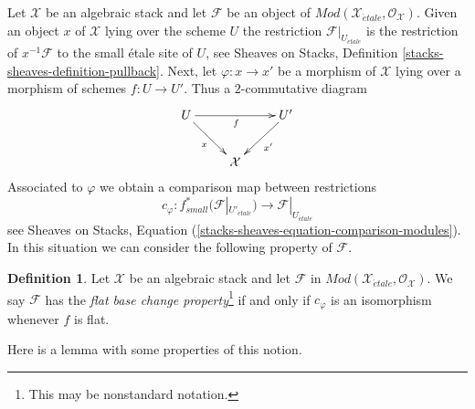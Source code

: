 \documentclass{stacks-project}
\theoremstyle{plain}
\theoremstyle{definition}
\newtheorem{definition}[subsection]{Definition}
\theoremstyle{remark}
\numberwithin{equation}{subsection}
\def\etale{{\acute{e}tale}}
\begin{document}
\noindent
Let $\mathcal{X}$ be an algebraic stack and let $\mathcal{F}$ be an object
of $\textit{Mod}(\mathcal{X}_\etale, \mathcal{O}_\mathcal{X})$.
Given an object $x$ of $\mathcal{X}$ lying over the scheme $U$ the
restriction $\mathcal{F}|_{U_\etale}$ is the restriction of
$x^{-1}\mathcal{F}$ to the small \'etale site of $U$, see
Sheaves on Stacks, Definition \ref{stacks-sheaves-definition-pullback}.
Next, let $\varphi : x \to x'$ be a morphism of $\mathcal{X}$ lying
over a morphism of schemes $f : U \to U'$. Thus a $2$-commutative diagram
$$
\xymatrix{
U \ar[rd]_x \ar[rr]_f & & U' \ar[ld]^{x'} \\
& \mathcal{X}
}
$$
Associated to $\varphi$ we obtain a comparison map between restrictions
\begin{equation}
\label{equation-comparison-modules}
c_\varphi :
f_{small}^*(\mathcal{F}|_{U'_\etale})
\longrightarrow
\mathcal{F}|_{U_\etale}
\end{equation}
see Sheaves on Stacks, Equation
(\ref{stacks-sheaves-equation-comparison-modules}).
In this situation we can consider the following property
of $\mathcal{F}$.

\begin{definition}
\label{definition-flat-base-change}
Let $\mathcal{X}$ be an algebraic stack and let $\mathcal{F}$ in
$\textit{Mod}(\mathcal{X}_\etale, \mathcal{O}_\mathcal{X})$.
We say $\mathcal{F}$ has the {\it flat base change property}\footnote{This
may be nonstandard notation.}
if and only if $c_\varphi$ is an isomorphism whenever $f$ is flat.
\end{definition}

\noindent
Here is a lemma with some properties of this notion.
\end{document}
